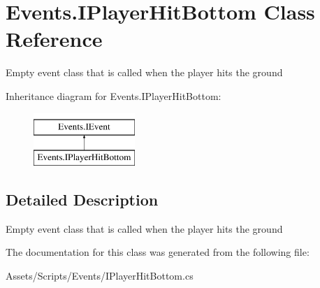 \hypertarget{class_events_1_1_i_player_hit_bottom}{}\section{Events.\+I\+Player\+Hit\+Bottom Class Reference}
\label{class_events_1_1_i_player_hit_bottom}


Empty event class that is called when the player hits the ground  


Inheritance diagram for Events.\+I\+Player\+Hit\+Bottom\+:\begin{figure}[H]
\begin{center}
\leavevmode
\includegraphics[height=2.000000cm]{class_events_1_1_i_player_hit_bottom}
\end{center}
\end{figure}


\subsection{Detailed Description}
Empty event class that is called when the player hits the ground 



The documentation for this class was generated from the following file\+:\begin{DoxyCompactItemize}
\item 
Assets/\+Scripts/\+Events/I\+Player\+Hit\+Bottom.\+cs\end{DoxyCompactItemize}
